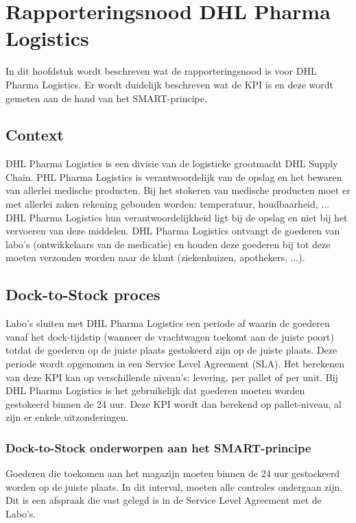 
\chapter{Rapporteringsnood DHL Pharma Logistics}
\label{ch:rapporteringsnood}
In dit hoofdstuk wordt beschreven wat de rapporteringsnood is voor DHL Pharma Logistics. Er wordt duidelijk beschreven wat de KPI is en deze wordt gemeten aan de hand van het SMART-principe. 

\section{Context}
DHL Pharma Logistics is een divisie van de logistieke grootmacht DHL Supply Chain. PHL Pharma Logistics is verantwoordelijk van de opslag en het bewaren van allerlei medische producten. Bij het stokeren van medische producten moet er met allerlei zaken rekening gebouden worden: temperatuur, houdbaarheid, ... DHL Pharma Logistics hun verantwoordelijkheid ligt bij de opslag en niet bij het vervoeren van deze middelen. DHL Pharma Logistics ontvangt de goederen van labo's (ontwikkelaars van de medicatie) en houden deze goederen bij tot deze moeten verzonden worden naar de klant (ziekenhuizen, apothekers, ...).

\section{Dock-to-Stock proces}
Labo's sluiten met DHL Pharma Logistics een periode af waarin de goederen vanaf het dock-tijdstip (wanneer de vrachtwagen toekomt aan de juiste poort) totdat de goederen op de juiste plaats gestokeerd zijn op de juiste plaats.
Deze periode wordt opgenomen in een Service Level Agreement (SLA). Het berekenen van deze KPI kan op verschillende niveau's: levering, per pallet of per unit. Bij DHL Pharma Logistics is het gebruikelijk dat goederen moeten worden gestokeerd binnen de 24 uur. Deze KPI wordt dan berekend op pallet-niveau, al zijn er enkele uitzonderingen.

\subsection{Dock-to-Stock onderworpen aan het SMART-principe}
Goederen die toekomen aan het magazijn moeten binnen de 24 uur gestockeerd worden op de juiste plaats. In dit interval, moeten alle controles ondergaan zijn. Dit is een afspraak die vast gelegd is in de Service Level Agreement met de Labo's.

